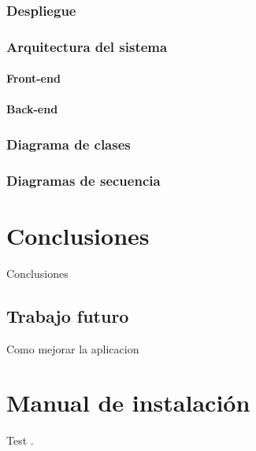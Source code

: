 \documentclass[openright,twoside,10pt]{book}
\begin{document}
    \subsection{Despliegue}\label{despliegue}
    
    \subsection{Arquitectura del sistema}\label{arquitectura-del-sistema}
    
    \subsubsection{Front-end}\label{front-end}
    
    \subsubsection{Back-end}\label{back-end}
    
    \subsection{Diagrama de clases}\label{diagrama-de-clases}
    
    \subsection{Diagramas de secuencia}\label{diagramas-de-secuencia}
    
    \chapter{Conclusiones}\label{conclusiones}
    
    Conclusiones
    
    \section{Trabajo futuro}\label{trabajo-futuro}
    
    Como mejorar la aplicacion
    
    \appendix
    
    \chapter{Manual de instalación}\label{manual-de-instalaciuxf3n}
    
    Test \autocite{rajwar_going_2012}.
    
\end{document}
